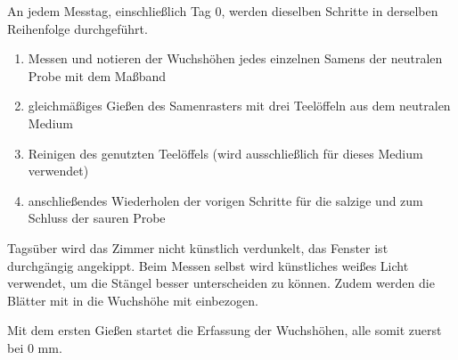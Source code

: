         \newpage
        An jedem Messtag, einschließlich Tag 0, werden dieselben Schritte in derselben Reihenfolge durchgeführt.
        \begin{enumerate}[1.]
            \item Messen und notieren der Wuchshöhen jedes einzelnen Samens der neutralen Probe mit dem Maßband
            \item gleichmäßiges Gießen des Samenrasters mit drei Teelöffeln aus dem neutralen Medium
            \item Reinigen des genutzten Teelöffels (wird ausschließlich für dieses Medium verwendet)
            \item anschließendes Wiederholen der vorigen Schritte für die salzige und zum Schluss der sauren Probe
        \end{enumerate}
        Tagsüber wird das Zimmer nicht künstlich verdunkelt, das Fenster ist durchgängig angekippt. Beim Messen selbst wird künstliches weißes Licht verwendet, um die Stängel besser unterscheiden zu können. Zudem werden die Blätter mit in die Wuchshöhe mit einbezogen.

        Mit dem ersten Gießen startet die Erfassung der Wuchshöhen, alle somit zuerst\\bei 0 mm.
    
